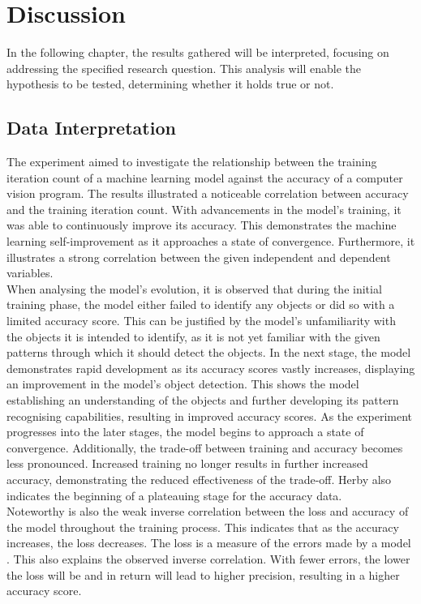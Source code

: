 \section{Discussion}
In the following chapter, the results gathered will be interpreted, focusing on addressing the specified research question. This analysis will enable the hypothesis to be tested, determining whether it holds true or not.

\subsection{Data Interpretation}

The experiment aimed to investigate the relationship between the training iteration count of a machine learning model against the accuracy of a computer vision program. The results illustrated a noticeable correlation between accuracy and the training iteration count. With advancements in the model's training, it was able to continuously improve its accuracy. This demonstrates the machine learning self-improvement as it approaches a state of convergence. Furthermore, it illustrates a strong correlation between the given independent and dependent variables. \\

When analysing the model's evolution, it is observed that during the initial training phase, the model either failed to identify any objects or did so with a limited accuracy score. This can be justified by the model's unfamiliarity with the objects it is intended to identify, as it is not yet familiar with the given patterns through which it should detect the objects. In the next stage, the model demonstrates rapid development as its accuracy scores vastly increases, displaying an improvement in the model's object detection. This shows the model establishing an understanding of the objects and further developing its pattern recognising capabilities, resulting in improved accuracy scores. As the experiment progresses into the later stages, the model begins to approach a state of convergence. Additionally, the trade-off between training and accuracy becomes less pronounced. Increased training no longer results in further increased accuracy, demonstrating the reduced effectiveness of the trade-off. Herby also indicates the beginning of a plateauing stage for the accuracy data.  \\ 

Noteworthy is also the weak inverse correlation between the loss and accuracy of the model throughout the training process. This indicates that as the accuracy increases, the loss decreases. The loss is a measure of the errors made by a model \parencite{Baeldung2022}. This also explains the observed inverse correlation. With fewer errors, the lower the loss will be and in return will lead to higher precision, resulting in a higher accuracy score. \\


